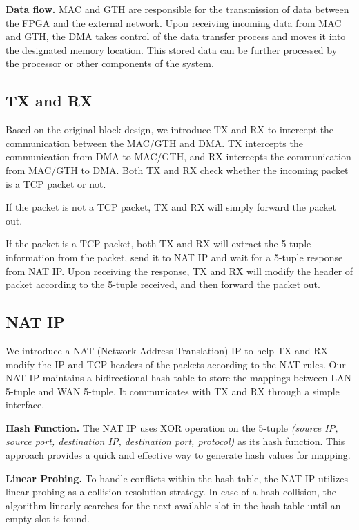    \textbf{Data flow.} MAC and GTH are responsible for the transmission of data between the FPGA and the external network. Upon receiving incoming data from MAC and GTH, the DMA takes control of the data transfer process and moves it into the designated memory location. This stored data can be further processed by the processor or other components of the system.

\subsection{TX and RX}

    Based on the original block design, we introduce TX and RX to intercept the communication between the MAC/GTH and DMA. TX intercepts the communication from DMA to MAC/GTH, and RX intercepts the communication from MAC/GTH to DMA. Both TX and RX check whether the incoming packet is a TCP packet or not. 
    
    If the packet is not a TCP packet, TX and RX will simply forward the packet out.

    If the packet is a TCP packet, both TX and RX will extract the 5-tuple information from the packet, send it to NAT IP and wait for a 5-tuple response from NAT IP. Upon receiving the response, TX and RX will modify the header of packet according to the 5-tuple received, and then forward the packet out.

\subsection{NAT IP}

    We introduce a NAT (Network Address Translation) IP to help TX and RX modify the IP and TCP headers of the packets according to the NAT rules. Our NAT IP maintains a bidirectional hash table to store the mappings between LAN 5-tuple and WAN 5-tuple. It communicates with TX and RX through a simple interface. 

    \textbf{Hash Function.} The NAT IP uses XOR operation on the 5-tuple \emph{(source IP, source port, destination IP, destination port, protocol)} as its hash function. This approach provides a quick and effective way to generate hash values for mapping.

    \textbf{Linear Probing.} To handle conflicts within the hash table, the NAT IP utilizes linear probing as a collision resolution strategy. In case of a hash collision, the algorithm linearly searches for the next available slot in the hash table until an empty slot is found.

